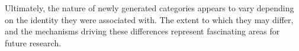 \documentclass[10pt,letterpaper]{article}
\begin{document}
Ultimately, the nature of newly generated categories appears to vary depending on the identity they were associated with. The extent to which they may differ, and the mechanisms driving these differences represent fascinating areas for future research.





\setlength{\bibleftmargin}{.125in}
\setlength{\bibindent}{-\bibleftmargin}


\end{document}
